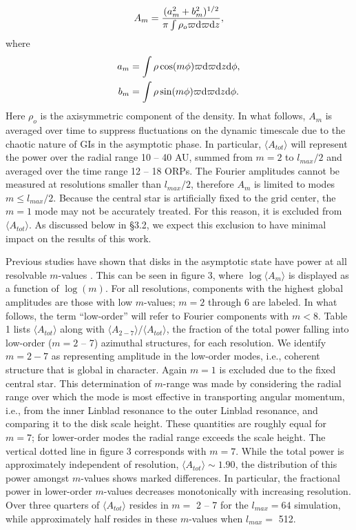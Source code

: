 \documentclass[manuscript]{aastex}
\begin{document}
\begin{equation}
A_m = \frac{(a_m^2 + b_m^2)^{1/2}}{\pi\int\rho_o \varpi {\rm d}\varpi {\rm d}z},
\end{equation}
where
\begin{subequations}
\begin{align}
a_m &= \int \rho \cos(m\phi)\varpi {\rm d}\varpi {\rm d}z {\rm d}\phi,\\
b_m &=\int \rho \sin(m\phi)\varpi {\rm d}\varpi {\rm d}z {\rm d}\phi.
\end{align}
\end{subequations}
Here  $\rho_o$ is the axisymmetric component of the density. In what follows, $A_m$ is averaged over time to suppress fluctuations on the dynamic timescale due to the chaotic nature of GIs in the asymptotic  phase.
In particular, $\langle A_{tot} \rangle$ will represent the power over the radial range 10 -- 40 AU, summed from $ m = 2$ to $l_{max}/2$ and averaged over the time range 12 -- 18 ORPs. The Fourier amplitudes cannot be measured at resolutions smaller than $l_{max}/2$, therefore $A_m$ is limited to modes $m \le l_{max}/2$.  
Because the central star is artificially fixed to the grid center, the $m=1$ mode may not
be accurately treated. For this reason, it is excluded from $\langle A_{tot} \rangle$.  As discussed below in \S3.2,
we expect this exclusion to have minimal impact on the results of this work.


Previous studies have shown that disks in the asymptotic state have power at all resolvable $m$-values  \citep
{lodato2004,mejia2005,boley2006,cossins2009}.  This can be seen in
figure 3, where $\log \langle A_m\rangle$ is displayed as a function of $\log(m)$.  For all resolutions, components with the highest global amplitudes are those with low $m$-values; $m=2$ through 6 are labeled.  
In what follows, the term ``low-order''  will refer to Fourier components with $m <  8$.
Table 1 lists $\langle A_{tot} \rangle$ along with $\langle A_{2-7} 
\rangle  /  \langle A_{tot} \rangle$,  the fraction of the total power falling into low-order ($m = 2$ -- 7) azimuthal structures, 
for each resolution. 
We identify $m=2-7$ as representing amplitude in the low-order modes, i.e., coherent structure that is
global in character.   Again 
$m=1$ is excluded due to the fixed central star. This determination of $m$-range
was made by considering the radial range over 
which the mode is most effective in transporting angular momentum, i.e., from the inner Linblad resonance to the outer 
Linblad resonance, and comparing it to the disk scale height. These quantities are roughly equal for $m=7$; for 
lower-order modes the radial range exceeds the scale height. The vertical dotted line in figure 3 corresponds with $m=7$. 
While the total power is approximately independent of resolution, $\langle A_{tot} \rangle \sim 1.90$, 
the distribution of this power amongst $m$-values
shows marked differences. In particular, the fractional power in lower-order $m$-values decreases monotonically with increasing resolution.  Over three quarters of $\langle A_{tot} \rangle$ resides
in $m =$ 2 -- 7 for the $l_{max} = 64$ simulation, while approximately half resides in these $m$-values when $l_{max} =$ 512.
\end{document}
